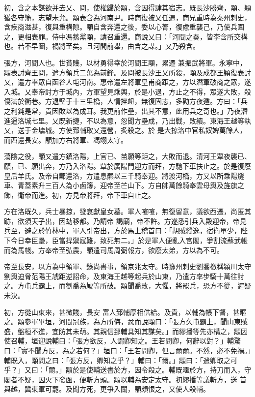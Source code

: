 \begin{pinyinscope}
 初，含之本謀欲并去乂、冏，使權歸於顒，含因得肆其宿志。既長沙勝齊，顒、穎猶各守籓，志望未允。顒表含為河南尹。時商復被乂任遇，商兄重時為秦州刺史，含疾商滋甚，復與重構隙。顒自含奔還之後，委以心膂，復慮重襲己，乃使兵圍之，更相表罪。侍中馮蓀黨顒，請召重還。商說乂曰：「河間之奏，皆李含所交構也。若不早圖，禍將至矣。且河間前舉，由含之謀。」乂乃殺含。



 張方，河間人也。世貧賤，以材勇得幸於河間王顒，累遷
 兼振武將軍。永寧中，顒表討齊王冏，遣方領兵二萬為前鋒。及冏被長沙王乂所殺，顒及成都王穎復表討乂，遣方率眾自函谷人屯河南。惠帝遣左將軍皇甫商距之，方以潛軍破商之眾，遂入城。乂奉帝討方于城內，方軍望見乘輿，於是小退，方止之不得，眾遂大敗，殺傷滿於衢巷。方退壁于十三里橋，人情挫衄，無復固志，多勸方夜遁。方曰：「兵之利鈍是常，貴因敗以為成耳。我更前作壘，出其不意，此用兵之奇也。」乃夜潛進逼洛城七里。乂既新捷，不以為意，忽聞方壘成，乃出戰，敗績。東海王越等執乂，送于金墉城。方使郅輔取乂還營，炙殺之。於
 是大掠洛中官私奴婢萬餘人，而西還長安。顒加方右將軍、馮翊太守。



 蕩陰之役，顒又遣方鎮洛陽，上官已、苗願等距之，大敗而退。清河王覃夜襲已、願，已、願出奔，方乃入洛陽。覃於廣陽門迎方而拜，方馳下車扶止之。於是復廢皇后羊氏。及帝自鄴還洛，方遣息羆以三千騎奉迎。將渡河橋，方又以所乘陽燧車、青蓋素升三百人為小鹵簿，迎帝至芒山下。方自帥萬餘騎奉雲母輿及旌旗之飾，衛帝而進。初，方見帝將拜，帝下車自止之。



 方在洛既久，兵士暴掠，發哀獻皇女墓。軍人喧喧，無復留意，議欲西遷，尚匿其跡，欲須天子出，因劫移都。乃請帝
 謁廟，帝不許。方遂悉引兵入殿迎帝，帝見兵至，避之於竹林中，軍人引帝出，方於馬上稽首曰：「胡賊縱逸，宿衛單少，陛下今日幸臣壘，臣當捍禦寇難，致死無二。」於是軍人便亂入宮閣，爭割流蘇武帳而為馬帴。方奉帝至弘農，顒遣司馬周弼報方，欲廢太弟，方以為不可。



 帝至長安，以方為中領軍、錄尚書事，領京兆太守。時豫州刺史劉喬檄稱潁川太守劉輿迫脅范陽王虓距逆詔命，及東海王越等起兵於山東，乃遣方率步騎十萬往討之。方屯兵霸上，而劉喬為虓等所破。顒聞喬敗，大懼，將罷兵，恐方不從，遲疑未決。



 初，方從山東來，甚微賤，長安
 富人郅輔厚相供給。及貴，以輔為帳下督，甚暱之。顒參軍畢垣，河間冠族，為方所侮，忿而說顒曰：「張方久屯霸上，聞山東賊盛，盤桓不進，宜防其未萌。其親信郅輔具知其謀矣。」而繆播等先亦構之，顒因使召輔，垣迎說輔曰：「張方欲反，人謂卿知之。王若問卿，何辭以對？」輔驚曰：「實不聞方反，為之若何？」垣曰：「王若問卿，但言爾爾。不然，必不免禍。」輔既入，顒問之曰：「張方反，卿知之乎？」輔曰：「爾。」顒曰：「遣卿取之可乎？」又曰：「爾。」顒於是使輔送書於方，因令殺之。輔既暱於方，持刀而入，守閣者不疑，因火下發函，便斬方頭。顒以輔為安定太守。初繆播等議斬方，送
 首與越，冀東軍可罷。及聞方死，更爭入關，顒頗恨之，又使人殺輔。




\end{pinyinscope}
